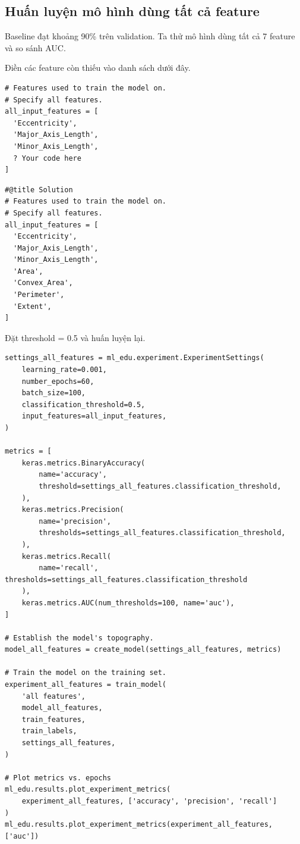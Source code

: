\documentclass[12pt,a4paper]{article}
\begin{document}
\subsection{Huấn luyện mô hình dùng tất cả feature}

\begin{dongco}[title={Có cần tất cả feature không?}]
Baseline đạt khoảng 90\% trên validation. Ta thử mô hình dùng tất cả 7 feature và so sánh AUC.
\end{dongco}

\begin{phuongphap}[title={Bài tập điền feature còn thiếu}]
Điền các feature còn thiếu vào danh sách dưới đây.
\end{phuongphap}

\begin{lstlisting}
# Features used to train the model on.
# Specify all features.
all_input_features = [
  'Eccentricity',
  'Major_Axis_Length',
  'Minor_Axis_Length',
  ? Your code here
]
\end{lstlisting}

\begin{lstlisting}
#@title Solution
# Features used to train the model on.
# Specify all features.
all_input_features = [
  'Eccentricity',
  'Major_Axis_Length',
  'Minor_Axis_Length',
  'Area',
  'Convex_Area',
  'Perimeter',
  'Extent',
]
\end{lstlisting}

\begin{phuongphap}[title={Huấn luyện mô hình đầy đủ feature và vẽ metric}]
Đặt threshold = 0.5 và huấn luyện lại.
\end{phuongphap}

\begin{lstlisting}
settings_all_features = ml_edu.experiment.ExperimentSettings(
    learning_rate=0.001,
    number_epochs=60,
    batch_size=100,
    classification_threshold=0.5,
    input_features=all_input_features,
)

metrics = [
    keras.metrics.BinaryAccuracy(
        name='accuracy',
        threshold=settings_all_features.classification_threshold,
    ),
    keras.metrics.Precision(
        name='precision',
        thresholds=settings_all_features.classification_threshold,
    ),
    keras.metrics.Recall(
        name='recall', thresholds=settings_all_features.classification_threshold
    ),
    keras.metrics.AUC(num_thresholds=100, name='auc'),
]

# Establish the model's topography.
model_all_features = create_model(settings_all_features, metrics)

# Train the model on the training set.
experiment_all_features = train_model(
    'all features',
    model_all_features,
    train_features,
    train_labels,
    settings_all_features,
)

# Plot metrics vs. epochs
ml_edu.results.plot_experiment_metrics(
    experiment_all_features, ['accuracy', 'precision', 'recall']
)
ml_edu.results.plot_experiment_metrics(experiment_all_features, ['auc'])
\end{lstlisting}
\end{document}
